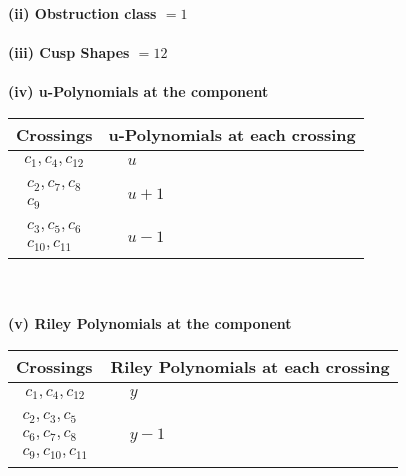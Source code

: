 \documentclass[1p]{elsarticle_modified}
\theoremstyle{definition}
\begin{document}
\flushleft \textbf{(ii) Obstruction class $= 1$}\\~\\
\flushleft \textbf{(iii) Cusp Shapes $= 12$}\\~\\
\newpage\renewcommand{\arraystretch}{1}
\flushleft \textbf{(iv) u-Polynomials at the component}\newline \\
\begin{tabular}{m{50pt}|m{274pt}}
Crossings & \hspace{64pt}u-Polynomials at each crossing \\
\hline $$\begin{aligned}c_{1},c_{4},c_{12}\end{aligned}$$&$\begin{aligned}
&u
\end{aligned}$\\
\hline $$\begin{aligned}c_{2},c_{7},c_{8}\\c_{9}\end{aligned}$$&$\begin{aligned}
&u+1
\end{aligned}$\\
\hline $$\begin{aligned}c_{3},c_{5},c_{6}\\c_{10},c_{11}\end{aligned}$$&$\begin{aligned}
&u-1
\end{aligned}$\\
\hline
\end{tabular}\\~\\
\newpage\renewcommand{\arraystretch}{1}
\flushleft \textbf{(v) Riley Polynomials at the component}\newline \\
\begin{tabular}{m{50pt}|m{274pt}}
Crossings & \hspace{64pt}Riley Polynomials at each crossing \\
\hline $$\begin{aligned}c_{1},c_{4},c_{12}\end{aligned}$$&$\begin{aligned}
&y
\end{aligned}$\\
\hline $$\begin{aligned}c_{2},c_{3},c_{5}\\c_{6},c_{7},c_{8}\\c_{9},c_{10},c_{11}\end{aligned}$$&$\begin{aligned}
&y-1
\end{aligned}$\\
\hline
\end{tabular}\\~\\
\end{document}
